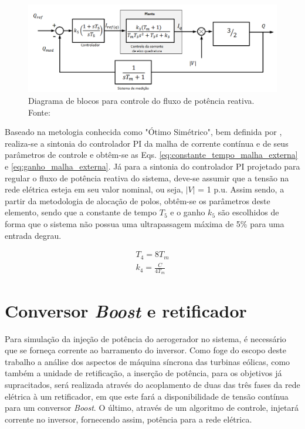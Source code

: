 \begin{figure}[!hbt]
	\begin{center}
		\includegraphics[width=0.9\columnwidth]{figuras/Diagram_Blocos_Malha_Externa_Reativa.PNG}
		\caption{Diagrama de blocos para controle do fluxo de potência reativa. Fonte: \cite{TeseProfAlex}}
		\label{fig:Diagrama_blocos_malha_externa_reativa}
	\end{center}
\end{figure}

Baseado na metologia conhecida como "Ótimo Simétrico", bem definida por \cite{ArticleRezek}, realiza-se a sintonia do controlador PI da malha de corrente contínua e de seus parâmetros de controle e obtêm-se as Eqs. \ref{eq:constante_tempo_malha_externa} e \ref{eq:ganho_malha_externa}. Já para a sintonia do controlador PI projetado para regular o fluxo de potência reativa do sistema, deve-se assumir que a tensão na rede elétrica esteja em seu valor nominal, ou seja, $|V|$ = 1 p.u. Assim sendo, a partir da metodologia de alocação de polos, obtêm-se os parâmetros deste elemento, sendo que a constante de tempo $T_5$ e o ganho $k_5$ são escolhidos de forma que o sistema não possua uma ultrapassagem máxima de 5\% para uma entrada degrau.

\begin{align}
	T_4 = 8T_m\label{eq:constante_tempo_malha_externa}\\
	k_4 = \frac{C}{4T_m}\label{eq:ganho_malha_externa}
\end{align}

\section{Conversor \textit{Boost} e retificador}

Para simulação da injeção de potência do aerogerador no sistema, é necessário que se forneça 
corrente ao barramento do inversor. Como foge do escopo deste trabalho a análise dos aspectos 
de máquina síncrona das turbinas eólicas, como também a unidade de retificação, 
a inserção de potência, para os objetivos já supracitados, será realizada através do 
acoplamento de duas das três fases da rede elétrica à um retificador, em que este fará a 
disponibilidade de tensão contínua para um conversor \textit{Boost}. O último, através de 
um algoritmo de controle, injetará corrente no inversor, fornecendo assim, 
potência para a rede elétrica. 

